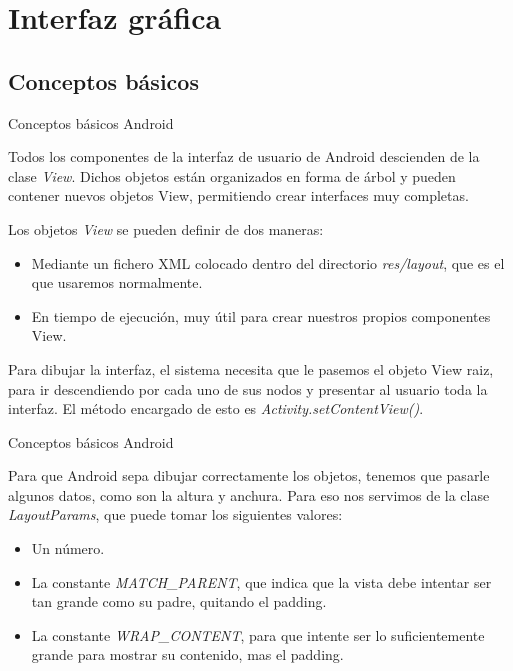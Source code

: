 \section{Interfaz gráfica}
\subsection{Conceptos básicos}
\begin{frame}{Conceptos básicos Android}
    \begin{block}{}Todos los componentes de la interfaz de usuario de Android descienden de la clase \textit{View}. Dichos objetos están organizados en forma de árbol y pueden contener nuevos objetos View, permitiendo crear interfaces muy completas.

Los objetos \textit{{View}} se pueden definir de dos maneras:
\begin{itemize}
    \item {
    \pause
        Mediante un fichero XML colocado dentro del directorio \textit{{res/layout}}, que es el que usaremos normalmente.
    }
    \item <2->{
        En tiempo de ejecución, muy útil para crear nuestros propios componentes View.
    }
\end{itemize}
Para dibujar la interfaz, el sistema necesita que le pasemos el objeto View raiz, para ir descendiendo por cada uno de sus nodos y presentar al usuario toda la interfaz. El método encargado de esto es \textit{{Activity.setContentView()}}.
    \end{block}
\end{frame}

\begin{frame}{Conceptos básicos Android}
    \begin{block}{}
Para que Android sepa dibujar correctamente los objetos, tenemos que pasarle algunos datos, como son la altura y anchura. Para eso nos servimos de la clase \textit{{LayoutParams}}, que puede tomar los siguientes valores:
    \begin{itemize}
    \item Un número. \pause
    \item <2-> La constante \textit{MATCH\_PARENT}, que indica que la vista debe intentar ser tan grande como su padre, quitando el padding.
    \item <3-> La constante \textit{WRAP\_CONTENT}, para que intente ser lo suficientemente grande para mostrar su contenido, mas el padding.
    \end{itemize}
    \end{block}
\end{frame}

